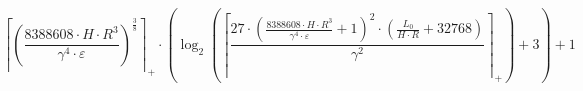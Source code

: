 \[\left\lceil \left(\frac{8388608 \cdot H \cdot R^{3}}{\gamma^{4} \cdot \varepsilon}\right)^{\frac{3}{8}} \right\rceil_{+} \cdot \left(\log_{2}\left(\left\lceil \frac{27 \cdot \left(\frac{8388608 \cdot H \cdot R^{3}}{\gamma^{4} \cdot \varepsilon} + 1\right)^{2} \cdot \left(\frac{L_0}{H \cdot R} + 32768\right)}{\gamma^{2}} \right\rceil_{+}\right) + 3\right) + 1\]
